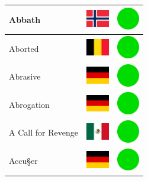 \documentclass[12pt, a4paper, twoside]{report}
\begin{document}
\begin{center}
\begin{longtable}{|p{5cm}|p{2cm}|p{2cm}|}
 Abbath                                                     & \includegraphics[width=1cm]{../img/flags/no} &   \includegraphics[width=1cm]{../likes/y} \\ \hline
 Aborted                                                    & \includegraphics[width=1cm]{../img/flags/be} &   \includegraphics[width=1cm]{../likes/y} \\ \hline
 Abrasive                                                   & \includegraphics[width=1cm]{../img/flags/de} &   \includegraphics[width=1cm]{../likes/y} \\ \hline
 Abrogation                                                 & \includegraphics[width=1cm]{../img/flags/de} &   \includegraphics[width=1cm]{../likes/y} \\ \hline
 A Call for Revenge                                         & \includegraphics[width=1cm]{../img/flags/mx} &   \includegraphics[width=1cm]{../likes/y} \\ \hline
 Accu§er                                                    & \includegraphics[width=1cm]{../img/flags/de} &   \includegraphics[width=1cm]{../likes/y} \\ \hline

\end{longtable}
\end{center}
\end{document}
